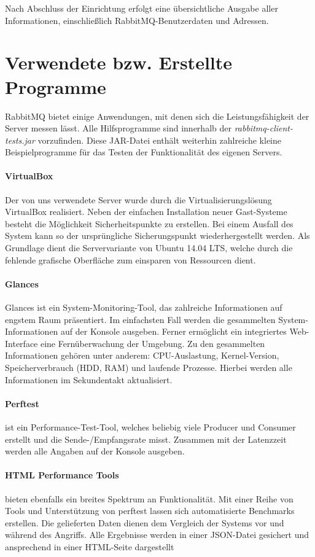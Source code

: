 \documentclass[	a4paper,
			11pt,
			titlepage,
			oneside,
			fleqn,
			listof=totoc,
			parskip,
			numbers=noenddot]{scrartcl}
\begin{document}
	Nach Abschluss der Einrichtung erfolgt eine übersichtliche Ausgabe aller Informationen, einschließlich RabbitMQ-Benutzerdaten und Adressen.
	
	
\clearpage
\section*{Verwendete bzw. Erstellte Programme}
	
	RabbitMQ bietet einige Anwendungen, mit denen sich die Leistungsfähigkeit der Server messen lässt. Alle Hilfsprogramme sind innerhalb der \textit{rabbitmq-client-tests.jar} vorzufinden. Diese JAR-Datei enthält weiterhin zahlreiche kleine Beispielprogramme für das Testen der Funktionalität des eigenen Servers. 
	
	\paragraph{VirtualBox} Der von uns verwendete Server wurde durch die Virtualisierungslösung VirtualBox realisiert. Neben der einfachen Installation neuer Gast-Systeme besteht die Möglichkeit Sicherheitspunkte zu erstellen. Bei einem Ausfall des System kann so der ursprüngliche Sicherungspunkt wiederhergestellt werden. Als Grundlage dient die Servervariante von Ubuntu 14.04 LTS, welche durch die fehlende grafische Oberfläche zum einsparen von Ressourcen dient.
	
	\paragraph{Glances} Glances ist ein System-Monitoring-Tool, das zahlreiche Informationen auf engstem Raum präsentiert. Im einfachsten Fall werden die gesammelten System-Informationen auf der Konsole ausgeben. Ferner ermöglicht ein integriertes Web-Interface eine Fernüberwachung der Umgebung. Zu den gesammelten Informationen gehören unter anderem: CPU-Auslastung, Kernel-Version, Speicherverbrauch (HDD, RAM) und laufende Prozesse. Hierbei werden alle Informationen im Sekundentakt aktualisiert.
	
	\paragraph{Perftest} ist ein Performance-Test-Tool, welches beliebig viele Producer und Consumer erstellt und die Sende-/Empfangsrate misst. Zusammen mit der Latenzzeit werden alle Angaben auf der Konsole ausgeben.

	\paragraph{HTML Performance Tools} bieten ebenfalls ein breites Spektrum an Funktionalität. Mit einer Reihe von Tools und Unterstützung von perftest lassen sich automatisierte Benchmarks erstellen. Die gelieferten Daten dienen dem Vergleich der Systems vor und während des Angriffs. Alle Ergebnisse werden in einer JSON-Datei gesichert und ansprechend in einer HTML-Seite dargestellt
\end{document}
